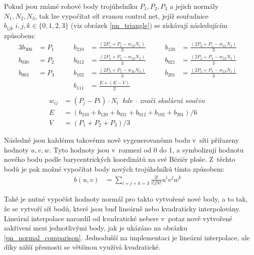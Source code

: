 Pokud jsou známé rohové body trojúhelníku $P_{1}, P_{2}, P_{3}$ a jejich normály $N_{1}, N_{2}, N_{3}$, tak lze vypočítat síť zvanou control net, jejíž souřadnice $b_{ijk}\;i,j,k \in \{0,1,2,3\}$ (viz obrázek \ref{pn_triangle}) se získávají následujícím způsobem:
\begin{alignat*}{3}
    b_{300} &= P_{1} \qquad &
    b_{210} &= \frac{(2P_{1} + P_{2} - w_{12}N_{1})}{3} \qquad &
    b_{120} &= \frac{(2P_{2} + P_{1} - w_{21}N_{2})}{3}  \\
    b_{030} &= P_{2} \qquad &
    b_{012} &= \frac{(2P_{3} + P_{2} - w_{32}N_{3})}{3} \qquad &
    b_{021} &= \frac{(2P_{2} + P_{3} - w_{23}N_{2})}{3}  \\
    b_{003} &= P_{3} \qquad &
    b_{102} &= \frac{(2P_{3} + P_{1} - w_{31}N_{3})}{3} \qquad &
    b_{201} &= \frac{(2P_{1} + P_{3} - w_{13}N_{1})}{3} \\
    && b_{111} &= \frac{E + (E - V)}{2} \\
\end{alignat*}
\begin{align*}
     w_{ij} &= (P_{j} - P{i}) \cdot N_{i}\: \: 
    \textit{kde $\cdot$ značí skalární součin} \nonumber  \\
    E &= (b_{210} + b_{120} + b_{021} + b_{012} + b_{102} + b_{201})/6 \nonumber \\
    V~&= (P_{1} + P_{2} + P_{3}) / 3 \nonumber 
\end{align*}

Následně jsou každému takovému nově vygenerovanému bodu v~síti přiřazeny hodnoty $u ,v, w$. Tyto hodnoty jsou v~rozmezí od 0 do 1, a symbolizují hodnotu nového bodu podle barycentrických koordinátů na své Béziér ploše. Z~těchto bodů je pak možné vypočítat body nových trojúhelníků tímto způsobem:
\begin{align}
b(u,v) &= \sum_{i+j+k=3} \frac{3!}{i!j!k!}u^{i}v^{j}w^{k} \nonumber
\end{align}

Také je nutné vypočíst hodnoty normál pro takto vytvořené nové body, a to tak, že se vytvoří síť bodů, které jsou buď lineárně nebo kvadraticky interpolovány. Lineární interpolace narozdíl od kvadratické nebere v~potaz nově vytvořené zakřivení mezi jednotlivými body, jak je ukázáno na obrázku \ref{pn_normal_comparison}. Jednodušší na implementaci je lineární interpolace, ale díky nižší přesnosti se většinou využívá kvadratické.

